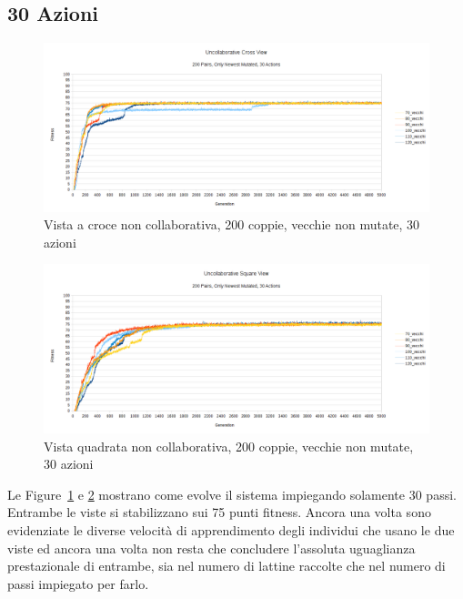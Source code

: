 \subsection{30 Azioni}
\begin{figure}[ht]
	\centering
	\includegraphics[scale=0.7,angle=90]{imgs/cross_nc_200_pairs_70_120_old_not_mutated_30_actions.png}
	\caption{Vista a croce non collaborativa, 200 coppie, vecchie non mutate, 30 azioni}
	\label{figure:cross_nc_200_70_120_non_30_actions}
\end{figure}
\begin{figure}[ht]
	\centering
	\includegraphics[scale=0.7,angle=90]{imgs/square_nc_200_pairs_70_120_old_not_mutated_30_actions.png}
	\caption{Vista quadrata non collaborativa, 200 coppie, vecchie non mutate, 30 azioni}
	\label{figure:square_nc_200_70_120_non_30_actions}
\end{figure}
Le Figure~\ref{figure:cross_nc_200_70_120_non_30_actions} e
\ref{figure:square_nc_200_70_120_non_30_actions} mostrano come evolve il sistema
impiegando solamente 30 passi. Entrambe le viste si stabilizzano sui 75 punti
fitness.\newline
Ancora una volta sono evidenziate le diverse velocità di apprendimento degli
individui che usano le due viste ed ancora una volta non resta che concludere
l'assoluta uguaglianza prestazionale di entrambe, sia nel numero di lattine
raccolte che nel numero di passi impiegato per farlo.
